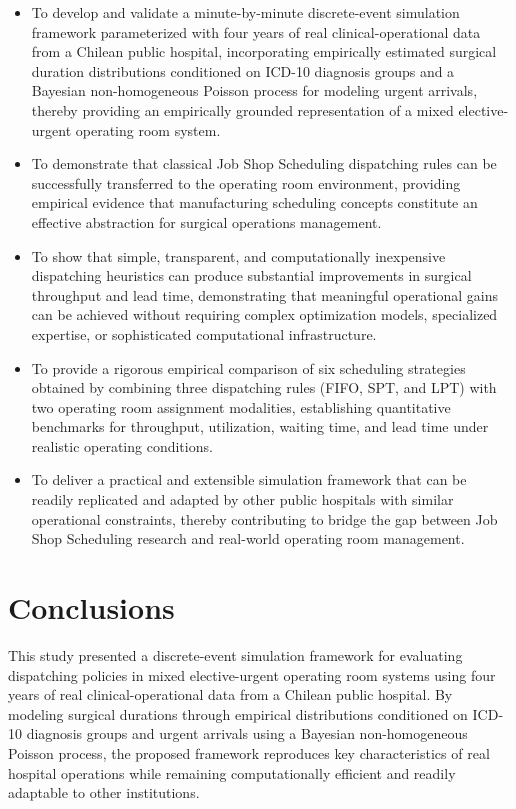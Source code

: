 \documentclass[sn-mathphys-num]{sn-jnl}
\begin{document}
\begin{itemize}

\item To develop and validate a minute-by-minute discrete-event simulation framework parameterized with four years of real clinical-operational data from a Chilean public hospital, incorporating empirically estimated surgical duration distributions conditioned on ICD-10 diagnosis groups and a Bayesian non-homogeneous Poisson process for modeling urgent arrivals, thereby providing an empirically grounded representation of a mixed elective-urgent operating room system.

\item To demonstrate that classical Job Shop Scheduling dispatching rules can be successfully transferred to the operating room environment, providing empirical evidence that manufacturing scheduling concepts constitute an effective abstraction for surgical operations management.

\item To show that simple, transparent, and computationally inexpensive dispatching heuristics can produce substantial improvements in surgical throughput and lead time, demonstrating that meaningful operational gains can be achieved without requiring complex optimization models, specialized expertise, or sophisticated computational infrastructure.

\item To provide a rigorous empirical comparison of six scheduling strategies obtained by combining three dispatching rules (FIFO, SPT, and LPT) with two operating room assignment modalities, establishing quantitative benchmarks for throughput, utilization, waiting time, and lead time under realistic operating conditions.

\item To deliver a practical and extensible simulation framework that can be readily replicated and adapted by other public hospitals with similar operational constraints, thereby contributing to bridge the gap between Job Shop Scheduling research and real-world operating room management.

\end{itemize}

\section{Conclusions}

This study presented a discrete-event simulation framework for evaluating dispatching policies in mixed elective-urgent operating room systems using four years of real clinical-operational data from a Chilean public hospital. By modeling surgical durations through empirical distributions conditioned on ICD-10 diagnosis groups and urgent arrivals using a Bayesian non-homogeneous Poisson process, the proposed framework reproduces key characteristics of real hospital operations while remaining computationally efficient and readily adaptable to other institutions.
\end{document}
